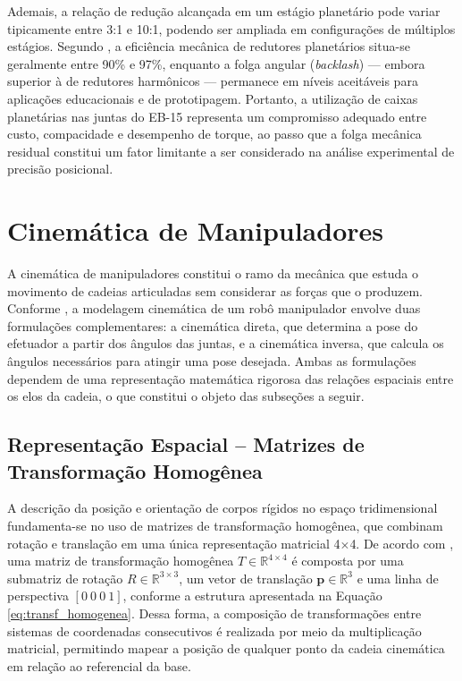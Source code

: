 Ademais, a relação de redução alcançada em um estágio planetário pode variar tipicamente entre 3:1 e 10:1, podendo ser ampliada em configurações de múltiplos estágios. Segundo , a eficiência mecânica de redutores planetários situa-se geralmente entre 90\% e 97\%, enquanto a folga angular (\textit{backlash}) — embora superior à de redutores harmônicos — permanece em níveis aceitáveis para aplicações educacionais e de prototipagem. Portanto, a utilização de caixas planetárias nas juntas do EB-15 representa um compromisso adequado entre custo, compacidade e desempenho de torque, ao passo que a folga mecânica residual constitui um fator limitante a ser considerado na análise experimental de precisão posicional.

\section{Cinemática de Manipuladores}

A cinemática de manipuladores constitui o ramo da mecânica que estuda o movimento de cadeias articuladas sem considerar as forças que o produzem. Conforme , a modelagem cinemática de um robô manipulador envolve duas formulações complementares: a cinemática direta, que determina a pose do efetuador a partir dos ângulos das juntas, e a cinemática inversa, que calcula os ângulos necessários para atingir uma pose desejada. Ambas as formulações dependem de uma representação matemática rigorosa das relações espaciais entre os elos da cadeia, o que constitui o objeto das subseções a seguir.

\subsection{Representação Espacial -- Matrizes de Transformação Homogênea}

A descrição da posição e orientação de corpos rígidos no espaço tridimensional fundamenta-se no uso de matrizes de transformação homogênea, que combinam rotação e translação em uma única representação matricial 4$\times$4. De acordo com , uma matriz de transformação homogênea $T \in \mathbb{R}^{4 \times 4}$ é composta por uma submatriz de rotação $R \in \mathbb{R}^{3 \times 3}$, um vetor de translação $\mathbf{p} \in \mathbb{R}^{3}$ e uma linha de perspectiva $[0 \ 0 \ 0 \ 1]$, conforme a estrutura apresentada na Equação \ref{eq:transf_homogenea}. Dessa forma, a composição de transformações entre sistemas de coordenadas consecutivos é realizada por meio da multiplicação matricial, permitindo mapear a posição de qualquer ponto da cadeia cinemática em relação ao referencial da base.

